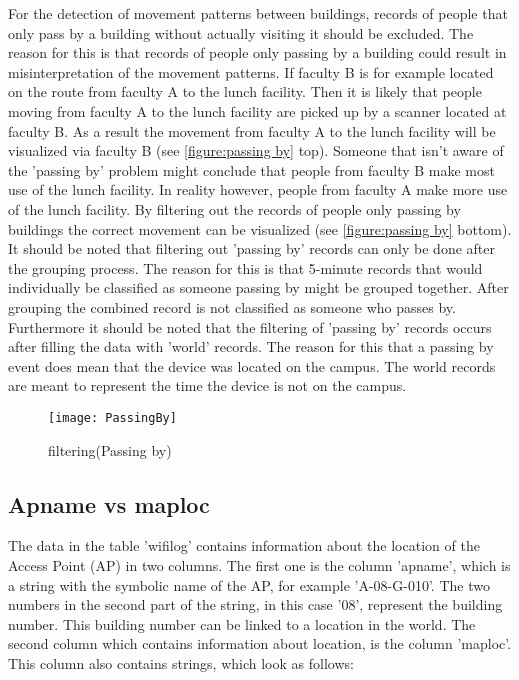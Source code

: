For the detection of movement patterns between buildings, records of people that only pass by a building without actually visiting it should be excluded. The reason for this is that records of people only passing by a building could result in misinterpretation of the movement patterns. If faculty B is for example located on the route from faculty A to the lunch facility. Then it is likely that people moving from faculty A to the lunch facility are picked up by a scanner located at faculty B. As a result the movement from faculty A to the lunch facility will be visualized via faculty B (see \autoref{figure:passing by} top). Someone that isn’t aware of the 'passing by' problem might conclude that people from faculty B make most use of the lunch facility. In reality however, people from faculty A make more use of the lunch facility. By filtering out the records of people only passing by buildings the correct movement can be visualized (see \autoref{figure:passing by} bottom). It should be noted that filtering out 'passing by' records can only be done after the grouping process. The reason for this is that 5-minute records that would individually be classified as someone passing by might be grouped together. After grouping the combined record is not classified as someone who passes by. Furthermore it should be noted that the filtering of 'passing by' records occurs after filling the data with 'world' records. The reason for this that a passing by event does mean that the device was located on the campus. The world records are meant to represent the time the device is not on the campus.

\begin{figure}[H]
\centering
\texttt{[image: PassingBy]}
\captionsetup{justification=centering}
\caption{filtering(Passing by)}
\label{figure:passing by}
\end{figure}
\subsection{Apname vs maploc}
The data in the table 'wifilog' contains information about the location of the Access Point (AP) in two columns. The first one is the column 'apname', which is a string with the symbolic name of the AP, for example 'A-08-G-010'. The two numbers in the second part of the string, in this case '08', represent the building number. This building number can be linked to a location in the world. 
The second column which contains information about location, is the column 'maploc'. This column also contains strings, which look as follows:

